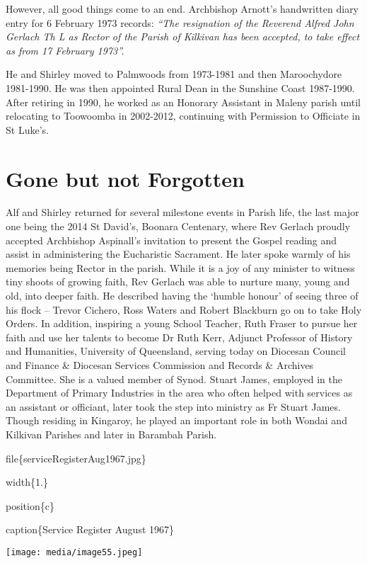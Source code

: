 However, all good things come to an end. Archbishop Arnott's handwritten diary entry for 6 February 1973 records: \emph{``The resignation of the Reverend Alfred John Gerlach Th L as Rector of the Parish of Kilkivan has been accepted, to take effect as from 17 February 1973''.}

He and Shirley moved to Palmwoods from 1973-1981 and then Maroochydore 1981-1990. He was then appointed Rural Dean in the Sunshine Coast 1987-1990. After retiring in 1990, he worked as an Honorary Assistant in Maleny parish until relocating to Toowoomba in 2002-2012, continuing with Permission to Officiate in St Luke's.

\hypertarget{gone-but-not-forgotten}{%
\section{Gone but not Forgotten}\label{gone-but-not-forgotten}}

Alf and Shirley returned for several milestone events in Parish life, the last major one being the 2014 St David's, Boonara Centenary, where Rev Gerlach proudly accepted Archbishop Aspinall's invitation to present the Gospel reading and assist in administering the Eucharistic Sacrament. He later spoke warmly of his memories being Rector in the parish. While it is a joy of any minister to witness tiny shoots of growing faith, Rev Gerlach was able to nurture many, young and old, into deeper faith. He described having the `humble honour' of seeing three of his flock -- Trevor Cichero, Ross Waters and Robert Blackburn go on to take Holy Orders. In addition, inspiring a young School Teacher, Ruth Fraser to pursue her faith and use her talents to become Dr Ruth Kerr, Adjunct Professor of History and Humanities, University of Queensland, serving today on Diocesan Council and Finance \& Diocesan Services Commission and Records \& Archives Committee. She is a valued member of Synod. Stuart James, employed in the Department of Primary Industries in the area who often helped with services as an assistant or officiant, later took the step into ministry as Fr Stuart James. Though residing in Kingaroy, he played an important role in both Wondai and Kilkivan Parishes and later in Barambah Parish.

file\{serviceRegisterAug1967.jpg\}

width\{1.\}

position\{c\}

caption\{Service Register August 1967\}

\texttt{[image: media/image55.jpeg]}

